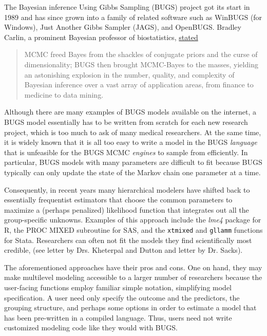 \documentclass[11pt,notitlepage]{article}
\begin{document}
The Bayesian inference Using Gibbs Sampling (BUGS) project got its start in 1989 and has 
since grown into a family of related software such as WinBUGS (for Windows), Just Another
Gibbs Sampler (JAGS), and OpenBUGS. Bradley Carlin, a prominent Bayesian professor of biostatistics, 
\href{http://www.mrc-bsu.cam.ac.uk/software/bugs/the-bugs-project-the-bugs-book/the-bugs-book-reviews/}{stated}
\begin{quote}
MCMC freed Bayes from the shackles of conjugate priors and the curse of dimensionality; 
BUGS then brought MCMC-Bayes to the masses, yielding an astonishing explosion in the number, 
quality, and complexity of Bayesian inference over a vast array of application areas, from 
finance to medicine to data mining.
\end{quote}
Although there are many examples of BUGS models available on the internet, a BUGS model
essentially has to be written from scratch for each new research project, which is too much
to ask of many medical researchers. At the same time, it is widely known that it is all too easy to 
write a model in the BUGS \textit{language} that is unfeasible for the BUGS MCMC \textit{engines} 
to sample from efficiently. In particular, BUGS models with many parameters are difficult to fit 
because BUGS typically can only update the state of the Markov chain one parameter at a time.

Consequently, in recent years many hierarchical modelers have shifted back to essentially
frequentist estimators that choose the common parameters to maximize a (perhaps penalized) 
likelihood function that integrates out all the group-specific unknowns. Examples of this
approach include the \textit{lme4} package for R, the PROC MIXED subroutine for SAS, and
the \texttt{xtmixed} and \texttt{gllamm} functions for Stata. Researchers can often not fit the models they find scientifically most credible, (see letter by Drs. Kheterpal and Dutton and letter by Dr. Sacks). 

The aforementioned approaches have their pros and cons. One on hand, they may make multilevel modeling 
accessible to a larger number
of researchers because the user-facing functions employ familiar simple notation, simplifying model specification. A user need only specify the
outcome and the predictors, the grouping structure, and perhaps some options in order to estimate
a model that has been pre-written in a compiled language. Thus, users need not write customized 
modeling code like they would with BUGS.
\end{document}
